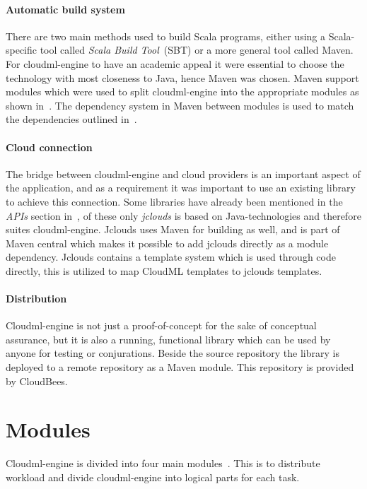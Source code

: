 \paragraph{Automatic build system}
There are two main methods used to build Scala programs, either using a Scala-specific tool called 
\emph{Scala Build Tool}~(SBT) or a more general tool called Maven. 
For cloudml-engine to have an academic appeal it were essential to choose the technology
with most closeness to Java, hence Maven was chosen.
Maven support modules which were used to split cloudml-engine into the appropriate 
modules as shown in~. 
The dependency system in Maven between modules is used to match the dependencies outlined in~.

\paragraph{Cloud connection}
The bridge between cloudml-engine and cloud providers is an important aspect of the application, and as a requirement
it was important to use an existing library to achieve this connection.
Some libraries have already been mentioned in the \emph{APIs} section in~,
of these only \emph{jclouds} is based on Java-technologies and therefore suites cloudml-engine.
Jclouds uses Maven for building as well, and is part of Maven central which makes 
it possible to add jclouds directly as a module dependency.
Jclouds contains a template system which is used through code directly, this is utilized 
to map CloudML templates to jclouds templates.

\paragraph{Distribution}
Cloudml-engine is not just a proof-of-concept for the sake of conceptual assurance, but it is 
also a running, functional library which can be used by anyone for testing or conjurations.
Beside the source repository\cite{cloudml-engine} the library is deployed to a remote repository
\cite{cloudbees-cloudml-engine} as a Maven module.
This repository is provided by CloudBees.

\section{Modules}

Cloudml-engine is divided into four main modules~.
This is to distribute workload and divide cloudml-engine into logical parts for each task.

